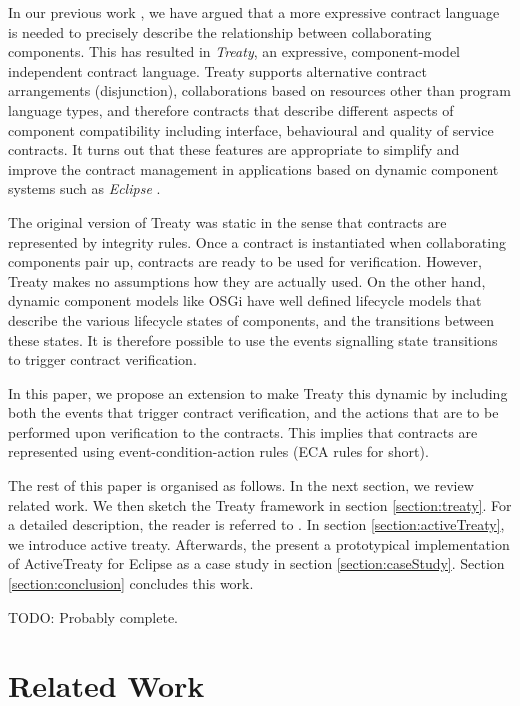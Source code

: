 \documentclass{llncs}
\begin{document}
In our previous work \cite{Treaty.JOT2009}, we have argued that a more expressive contract language is needed to precisely describe the relationship between collaborating components. This has resulted in \textit{Treaty}, an expressive, component-model independent contract language. Treaty supports alternative contract arrangements (disjunction), collaborations based on resources other than program language types, and therefore contracts that describe different aspects of component compatibility \cite{BeugnardEtAl99} including interface, behavioural and quality of service contracts. It turns out that these features are appropriate to simplify and improve the contract management in applications based on dynamic component systems such as \textit{Eclipse} \cite{Eclipse}. 

The original version of Treaty was static in the sense that contracts are represented by integrity rules. Once a contract is instantiated when collaborating components pair up, contracts are ready to be used for verification. However, Treaty makes no assumptions how they are actually used. On the other hand, dynamic component models like OSGi have well defined lifecycle models that describe the various lifecycle states of components, and the transitions between these states. It is therefore possible to use the events signalling state transitions to trigger contract verification. 

In this paper, we propose an extension to make Treaty this dynamic by including both the events that trigger contract verification, and the actions that are to be performed upon verification  to the contracts. This implies that contracts are represented using event-condition-action rules (ECA rules for short). 

The rest of this paper is organised as follows. In the next section, we review related work. We then sketch the Treaty framework in section \ref{section:treaty}. For a detailed description, the reader is referred to \cite{Treaty.JOT2009}. In section \ref{section:activeTreaty}, we introduce active treaty. Afterwards, the present a prototypical implementation of ActiveTreaty for Eclipse as a case study in section \ref{section:caseStudy}. Section \ref{section:conclusion} concludes this work.

TODO: Probably complete.



\section{Related Work}
\end{document}
